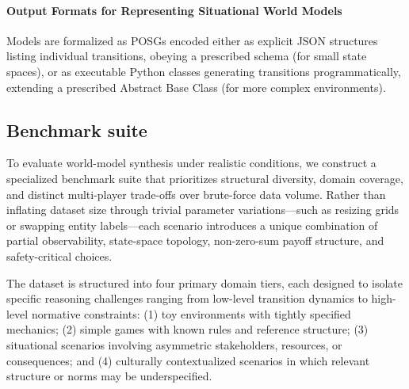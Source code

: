 \documentclass{article}
\begin{document}
\paragraph{Output Formats for Representing Situational World Models}
Models are formalized as POSGs encoded either as explicit JSON structures listing individual transitions, obeying a prescribed schema (for small state spaces), or as executable Python classes generating transitions programmatically, extending a prescribed Abstract Base Class (for more complex environments).


\subsection{Benchmark suite}
\label{sec:dataset}

To evaluate world-model synthesis under realistic conditions, we construct a specialized benchmark suite that prioritizes structural diversity, domain coverage, and distinct multi-player trade-offs over brute-force data volume. Rather than inflating dataset size through trivial parameter variations—such as resizing grids or swapping entity labels—each scenario introduces a unique combination of partial observability, state-space topology, non-zero-sum payoff structure, and safety-critical choices.

The dataset is structured into four primary domain tiers, each designed to isolate specific reasoning challenges ranging from low-level transition dynamics to high-level normative constraints:
(1) toy environments with tightly specified mechanics; (2) simple games with known rules and reference structure; (3) situational scenarios involving asymmetric stakeholders, resources, or consequences; and (4) culturally contextualized scenarios in which relevant structure or norms may be underspecified.

\end{document}

